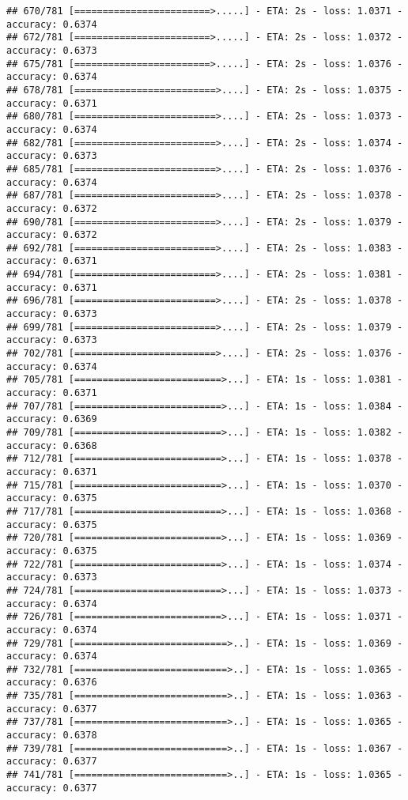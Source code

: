 \documentclass[
]{article}
\begin{document}
\begin{verbatim}
## 670/781 [========================>.....] - ETA: 2s - loss: 1.0371 - accuracy: 0.6374
## 672/781 [========================>.....] - ETA: 2s - loss: 1.0372 - accuracy: 0.6373
## 675/781 [========================>.....] - ETA: 2s - loss: 1.0376 - accuracy: 0.6374
## 678/781 [=========================>....] - ETA: 2s - loss: 1.0375 - accuracy: 0.6371
## 680/781 [=========================>....] - ETA: 2s - loss: 1.0373 - accuracy: 0.6374
## 682/781 [=========================>....] - ETA: 2s - loss: 1.0374 - accuracy: 0.6373
## 685/781 [=========================>....] - ETA: 2s - loss: 1.0376 - accuracy: 0.6374
## 687/781 [=========================>....] - ETA: 2s - loss: 1.0378 - accuracy: 0.6372
## 690/781 [=========================>....] - ETA: 2s - loss: 1.0379 - accuracy: 0.6372
## 692/781 [=========================>....] - ETA: 2s - loss: 1.0383 - accuracy: 0.6371
## 694/781 [=========================>....] - ETA: 2s - loss: 1.0381 - accuracy: 0.6371
## 696/781 [=========================>....] - ETA: 2s - loss: 1.0378 - accuracy: 0.6373
## 699/781 [=========================>....] - ETA: 2s - loss: 1.0379 - accuracy: 0.6373
## 702/781 [=========================>....] - ETA: 2s - loss: 1.0376 - accuracy: 0.6374
## 705/781 [==========================>...] - ETA: 1s - loss: 1.0381 - accuracy: 0.6371
## 707/781 [==========================>...] - ETA: 1s - loss: 1.0384 - accuracy: 0.6369
## 709/781 [==========================>...] - ETA: 1s - loss: 1.0382 - accuracy: 0.6368
## 712/781 [==========================>...] - ETA: 1s - loss: 1.0378 - accuracy: 0.6371
## 715/781 [==========================>...] - ETA: 1s - loss: 1.0370 - accuracy: 0.6375
## 717/781 [==========================>...] - ETA: 1s - loss: 1.0368 - accuracy: 0.6375
## 720/781 [==========================>...] - ETA: 1s - loss: 1.0369 - accuracy: 0.6375
## 722/781 [==========================>...] - ETA: 1s - loss: 1.0374 - accuracy: 0.6373
## 724/781 [==========================>...] - ETA: 1s - loss: 1.0373 - accuracy: 0.6374
## 726/781 [==========================>...] - ETA: 1s - loss: 1.0371 - accuracy: 0.6374
## 729/781 [===========================>..] - ETA: 1s - loss: 1.0369 - accuracy: 0.6374
## 732/781 [===========================>..] - ETA: 1s - loss: 1.0365 - accuracy: 0.6376
## 735/781 [===========================>..] - ETA: 1s - loss: 1.0363 - accuracy: 0.6377
## 737/781 [===========================>..] - ETA: 1s - loss: 1.0365 - accuracy: 0.6378
## 739/781 [===========================>..] - ETA: 1s - loss: 1.0367 - accuracy: 0.6377
## 741/781 [===========================>..] - ETA: 1s - loss: 1.0365 - accuracy: 0.6377

\end{verbatim}
\end{document}
